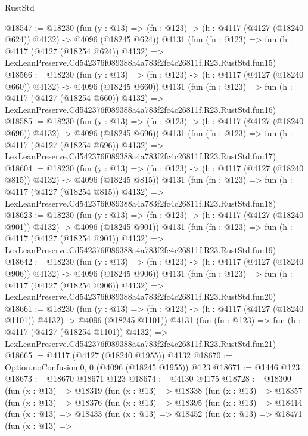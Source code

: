 \begin{lexlean}{RustStd}
\begin{coremodule}
@18547 := @18230
    (fun (y : @13) => (fn : @123) -> (h : @4117 (@4127 (@18240 @624)) @4132) -> @4096 (@18245 @624))
    @4131
    (fun (fn : @123) =>
    fun (h : @4117 (@4127 (@18254 @624)) @4132) =>
    LexLeanPreserve.Cd542376f089388a4a783f2fc4c26811f.R23.RustStd.fun15)
@18566 := @18230
    (fun (y : @13) => (fn : @123) -> (h : @4117 (@4127 (@18240 @660)) @4132) -> @4096 (@18245 @660))
    @4131
    (fun (fn : @123) =>
    fun (h : @4117 (@4127 (@18254 @660)) @4132) =>
    LexLeanPreserve.Cd542376f089388a4a783f2fc4c26811f.R23.RustStd.fun16)
@18585 := @18230
    (fun (y : @13) => (fn : @123) -> (h : @4117 (@4127 (@18240 @696)) @4132) -> @4096 (@18245 @696))
    @4131
    (fun (fn : @123) =>
    fun (h : @4117 (@4127 (@18254 @696)) @4132) =>
    LexLeanPreserve.Cd542376f089388a4a783f2fc4c26811f.R23.RustStd.fun17)
@18604 := @18230
    (fun (y : @13) => (fn : @123) -> (h : @4117 (@4127 (@18240 @815)) @4132) -> @4096 (@18245 @815))
    @4131
    (fun (fn : @123) =>
    fun (h : @4117 (@4127 (@18254 @815)) @4132) =>
    LexLeanPreserve.Cd542376f089388a4a783f2fc4c26811f.R23.RustStd.fun18)
@18623 := @18230
    (fun (y : @13) => (fn : @123) -> (h : @4117 (@4127 (@18240 @901)) @4132) -> @4096 (@18245 @901))
    @4131
    (fun (fn : @123) =>
    fun (h : @4117 (@4127 (@18254 @901)) @4132) =>
    LexLeanPreserve.Cd542376f089388a4a783f2fc4c26811f.R23.RustStd.fun19)
@18642 := @18230
    (fun (y : @13) => (fn : @123) -> (h : @4117 (@4127 (@18240 @906)) @4132) -> @4096 (@18245 @906))
    @4131
    (fun (fn : @123) =>
    fun (h : @4117 (@4127 (@18254 @906)) @4132) =>
    LexLeanPreserve.Cd542376f089388a4a783f2fc4c26811f.R23.RustStd.fun20)
@18661 := @18230
    (fun (y : @13) =>
    (fn : @123) -> (h : @4117 (@4127 (@18240 @1101)) @4132) -> @4096 (@18245 @1101))
    @4131
    (fun (fn : @123) =>
    fun (h : @4117 (@4127 (@18254 @1101)) @4132) =>
    LexLeanPreserve.Cd542376f089388a4a783f2fc4c26811f.R23.RustStd.fun21)
@18665 := @4117 (@4127 (@18240 @1955)) @4132
@18670 := Option.noConfusion.{0, 0} (@4096 (@18245 @1955)) @123
@18671 := @1446 @123
@18673 := @18670 @18671 @123
@18674 := @4130 @4175
@18728 := @18300
    (fun (x : @13) =>
    @18319
      (fun (x : @13) =>
      @18338
        (fun (x : @13) =>
        @18357
          (fun (x : @13) =>
          @18376
            (fun (x : @13) =>
            @18395
              (fun (x : @13) =>
              @18414
                (fun (x : @13) =>
                @18433
                  (fun (x : @13) =>
                  @18452
                    (fun (x : @13) =>
                    @18471
                      (fun (x : @13) =>

\end{coremodule}
\end{lexlean}
